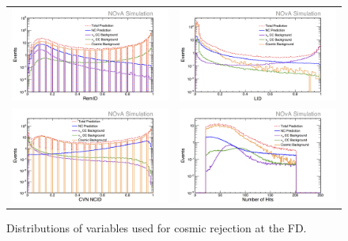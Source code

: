 \begin{figure}[h]
  \centering
  \begin{tabular}{c c}
    \includegraphics[width=.48\textwidth]{figures/NP1RmID.png} &
    \includegraphics[width=.48\textwidth]{figures/NP1ELID.png} \\
    \includegraphics[width=.48\textwidth]{figures/NP1CVNC.png} &
    \includegraphics[width=.48\textwidth]{figures/NP1NHit.png} \\
  \end{tabular}
  \caption[Cosmic Rejection Variable Distributions]{Distributions of variables used for cosmic rejection at the FD.}
  \label{fig:CosRej}
\end{figure}

